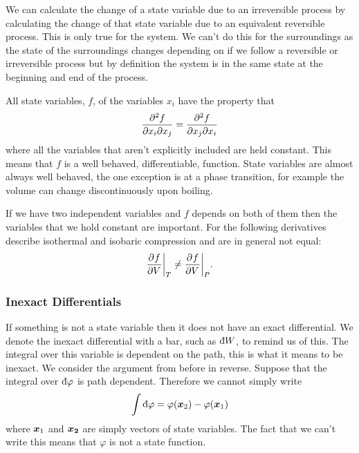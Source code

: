 \documentclass[a4paper]{article}
\newcommand{\ddbar}[1]{\text{\dj}{#1}}
\begin{document}
    We can calculate the change of a state variable due to an irreversible process by calculating the change of that state variable due to an equivalent reversible process.
    This is only true for the system.
    We can't do this for the surroundings as the state of the surroundings changes depending on if we follow a reversible or irreversible process but by definition the system is in the same state at the beginning and end of the process.
    
    All state variables, \(f\), of the variables \(x_i\) have the property that
    \[\frac{\partial^2{f}}{\partial{x_i}\partial{x_j}} = \frac{\partial^2{f}}{\partial{x_j}\partial{x_i}}\]
    where all the variables that aren't explicitly included are held constant.
    This means that \(f\) is a well behaved, differentiable, function.
    State variables are almost always well behaved, the one exception is at a phase transition, for example the volume can change discontinuously upon boiling.
    
    If we have two independent variables and \(f\) depends on both of them then the variables that we hold constant are important.
    For the following derivatives describe isothermal and isobaric compression and are in general not equal:
    \[\pdv[]{f}{V}\biggr|_{T} \ne \pdv[]{f}{V}\biggr|_{P}.\]
    
    \subsubsection{Inexact Differentials}
    If something is not a state variable then it does not have an exact differential.
    We denote the inexact differential with a bar, such as \(\ddbar{W}\), to remind us of this.
    The integral over this variable is dependent on the path, this is what it means to be inexact.
    We consider the argument from before in reverse.
    Suppose that the integral over \(\ddbar{\varphi}\) is path dependent.
    Therefore we cannot simply write
    \[\int\ddbar{\varphi} = \varphi(\vv{x}_2) - \varphi(\vv{x}_1)\]
    where \(\bm{x}_1\) and \(\bm{x_2}\) are simply vectors of state variables.
    The fact that we can't write this means that \(\varphi\) is not a state function.
    
\end{document}
